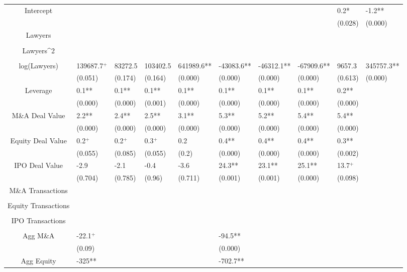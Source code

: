 \documentclass{article}
\begin{document}
\begin{table}[H]
\begin{tabular}{|clllllllll|}
Intercept &  &  &  &  &  &  &  & 0.2* & -1.2** \\ 
   &  &  &  &  &  &  &  & (0.028) & (0.000) \\ 
  Lawyers &  &  &  &  &  &  &  &  &  \\ 
   &  &  &  &  &  &  &  &  &  \\ 
  Lawyers^2 &  &  &  &  &  &  &  &  &  \\ 
   &  &  &  &  &  &  &  &  &  \\ 
  log(Lawyers) & 139687.7$^{+}$ & 83272.5 & 103402.5 & 641989.6** & -43083.6** & -46312.1** & -67909.6** & 9657.3 & 345757.3** \\ 
   & (0.051) & (0.174) & (0.164) & (0.000) & (0.000) & (0.000) & (0.000) & (0.613) & (0.000) \\ 
  Leverage & 0.1** & 0.1** & 0.1** & 0.1** & 0.1** & 0.1** & 0.1** & 0.2** &  \\ 
   & (0.000) & (0.000) & (0.001) & (0.000) & (0.000) & (0.000) & (0.000) & (0.000) &  \\ 
  M\&A Deal Value & 2.2** & 2.4** & 2.5** & 3.1** & 5.3** & 5.2** & 5.4** & 5.4** &  \\ 
   & (0.000) & (0.000) & (0.000) & (0.000) & (0.000) & (0.000) & (0.000) & (0.000) &  \\ 
  Equity Deal Value & 0.2$^{+}$ & 0.2$^{+}$ & 0.3$^{+}$ & 0.2 & 0.4** & 0.4** & 0.4** & 0.3** &  \\ 
   & (0.055) & (0.085) & (0.055) & (0.2) & (0.000) & (0.000) & (0.000) & (0.002) &  \\ 
  IPO Deal Value & -2.9 & -2.1 & -0.4 & -3.6 & 24.3** & 23.1** & 25.1** & 13.7$^{+}$ &  \\ 
   & (0.704) & (0.785) & (0.96) & (0.711) & (0.001) & (0.001) & (0.000) & (0.098) &  \\ 
  M\&A Transactions &  &  &  &  &  &  &  &  &  \\ 
   &  &  &  &  &  &  &  &  &  \\ 
  Equity Transactions &  &  &  &  &  &  &  &  &  \\ 
   &  &  &  &  &  &  &  &  &  \\ 
  IPO Transactions &  &  &  &  &  &  &  &  &  \\ 
   &  &  &  &  &  &  &  &  &  \\ 
  Agg M\&A & -22.1$^{+}$ &  &  &  & -94.5** &  &  &  &  \\ 
   & (0.09) &  &  &  & (0.000) &  &  &  &  \\ 
  Agg Equity & -325** &  &  &  & -702.7** &  &  &  &  \\ 

\end{tabular}
\end{table}
\end{document}
